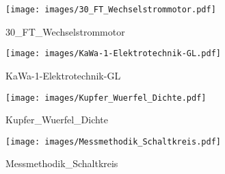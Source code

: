%
%
\begin{figure}[!hb]%
    \centering
  \texttt{[image: images/30\_FT\_Wechselstrommotor.pdf]}%
  \caption{30_FT_Wechselstrommotor}%
\end{figure}

%
%
\begin{figure}[!hb]%
    \centering
  \texttt{[image: images/KaWa-1-Elektrotechnik-GL.pdf]}%
  \caption{KaWa-1-Elektrotechnik-GL}%
\end{figure}

%
%
\begin{figure}[!hb]%
    \centering
  \texttt{[image: images/Kupfer\_Wuerfel\_Dichte.pdf]}%
  \caption{Kupfer_Wuerfel_Dichte}%
\end{figure}

%
%
\begin{figure}[!hb]%
    \centering
  \texttt{[image: images/Messmethodik\_Schaltkreis.pdf]}%
  \caption{Messmethodik_Schaltkreis}%
\end{figure}


